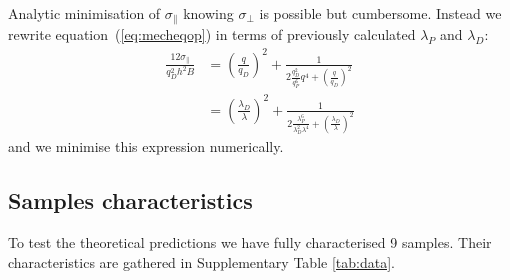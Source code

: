 \documentclass[twocolumn,superscriptaddress,showpacs,preprintnumbers,
amsmath,amssymb,prl]{revtex4-1}
\begin{document}
Analytic minimisation of $\sigma_\parallel$ knowing $\sigma_\perp$ is possible but cumbersome. Instead we rewrite equation~(\ref{eq:mecheqop}) in terms of previously calculated $\lambda_P$ and $\lambda_D$:
\begin{align}
\frac{12\sigma_\parallel}{q_D^2 h^2 B} &= \left(\frac{q}{q_D}\right)^2 + \frac{1}{2\frac{q_D^2}{q_P^6}q^4  + \left(\frac{q}{q_D}\right)^2}\\
&= \left(\frac{\lambda_D}{\lambda}\right)^2 + \frac{1}{2\frac{\lambda_P^6}{\lambda_D^2\lambda^4}  + \left(\frac{\lambda_D}{\lambda}\right)^2}
\end{align}
and we minimise this expression numerically.

\subsection*{Samples characteristics}
To test the theoretical predictions we have fully characterised 9 samples. Their characteristics are gathered in Supplementary Table \ref{tab:data}.
\end{document}
